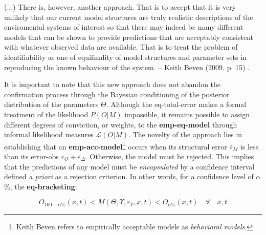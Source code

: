 \documentclass[./main_en.tex]{subfiles}
\begin{document}
\begin{adjustwidth}{100pt}{0pt}
\medskip
\small (...) There is, however, another approach. That is to accept that it is very unlikely that our current model structures are truly realistic descriptions of the enviromental systems of interest so that there may indeed be many different models that can be shown to provide predictions that are acceptably consistent with whatever observed data are available. That is to treat the problem of identifiability as one of equifinality of model structures and parameter sets in reproducing the known behaviour of the system. -- Keith Beven (2009. p. 15) \cite{Beven2009}.
\medskip
\end{adjustwidth}

\noindent It is important to note that this new approach does not abandon the confirmation process through the Bayesian \gls{conditioning} of the posterior distribution of the \gls{parameters} $\Theta$. Although the \gls{eq-total-error} makes a formal treatment of the \gls{likelihood} $P(O|M)$ impossible, it remains possible to assign different degrees of conviction, or weights, to the \textbf{\gls{emp-eq-model}} through informal \gls{likelihood} measures $\mathcal{L}(O|M)$. The novelty of the approach lies in establishing that an \textbf{\gls{emp-acc-model}}\footnote{Keith Beven refers to empirically acceptable models as \textit{behavioral models}.} occurs when its structural error $\varepsilon_M$ is less than its \gls{error-obs} $\varepsilon_O + \varepsilon_{\Delta}$. Otherwise, the \gls{model} must be rejected. This implies that the predictions of any \gls{model} must be \textit{encapsulated} by a confidence interval defined \textit{a priori} as a rejection criterion. In other words, for a confidence level of $\alpha$\%, the \textbf{\gls{eq-bracketing}}:
\begin{linenomath*}
\begin{equation}
\label{eq:bracketing}
    O_{100-\alpha\%}(x, t) < M(\Theta, \Upsilon, \varepsilon_{\Upsilon}, x, t) < O_{\alpha\%}(x, t) \quad \forall \quad x, t
\end{equation}
\end{linenomath*}
\end{document}
